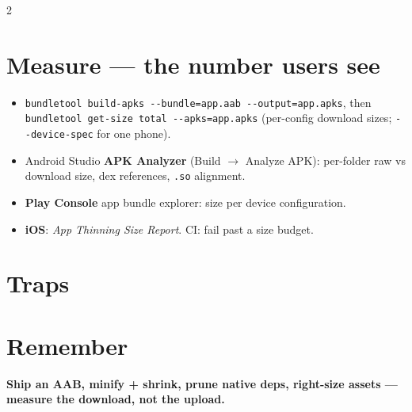 \documentclass[8pt]{extarticle}
\newcommand\dd{\hbox{-}\hbox{-}}
\begin{document}
\begin{multicols}{2}
\section{Measure — the number users see}
\begin{itemize}\raggedright
  \item \texttt{bundletool build-apks \dd{}bundle=app.aab \dd{}output=app.apks}, then
        \texttt{bundletool get-size total \dd{}apks=app.apks} (per-config download sizes;
        \texttt{\dd{}device-spec} for one phone).
  \item Android Studio \textbf{APK Analyzer} (Build $\to$ Analyze APK): per-folder raw vs
        download size, dex references, \texttt{.so} alignment.
  \item \textbf{Play Console} app bundle explorer: size per device configuration.
  \item \textbf{iOS}: \emph{App Thinning Size Report}. CI: fail past a size budget.
\end{itemize}

\section{Traps}
\begin{itemize}\raggedright
\end{itemize}

\section{Remember}
\textbf{Ship an AAB, minify + shrink, prune native deps, right-size assets — measure the
download, not the upload.}


\end{multicols}

\end{document}
